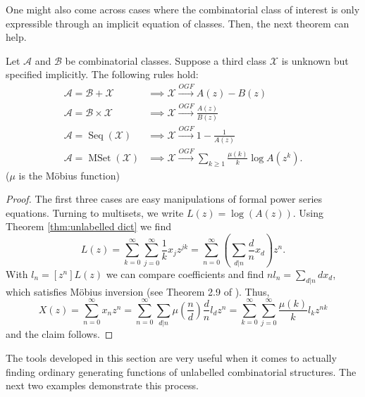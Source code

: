 One might also come across cases where the combinatorial class of interest is only expressible through an implicit equation of classes.
Then, the next theorem can help.

\begin{thm}
\label{thm:implogf}
Let $\mathcal{A}$ and $\mathcal{B}$ be combinatorial classes. Suppose a third class $\mathcal{X}$ is unknown but specified implicitly. The following rules hold:
\begin{align*}
    \mathcal{A} = \mathcal{B} + \mathcal{X} &\implies \mathcal{X} \xrightarrow{OGF} A(z) - B(z) \\
    \mathcal{A} = \mathcal{B} \times \mathcal{X} &\implies \mathcal{X} \xrightarrow{OGF} \frac{A(z)}{B(z)} \\
    \mathcal{A} = \operatorname{Seq}(\mathcal{X}) &\implies \mathcal{X} \xrightarrow{OGF} 1 - \frac{1}{A(z)} \\
    \mathcal{A} = \operatorname{MSet}(\mathcal{X}) &\implies \mathcal{X} \xrightarrow{OGF} \sum_{k \geq 1} \frac{\mu (k)}{k} \log A(z^k).
\end{align*}
($\mu$ is the Möbius function)
\end{thm}
\begin{proof}
The first three cases are easy manipulations of formal power series equations. 
Turning to multisets, we write $L(z) = \log(A(z))$.
Using Theorem \ref{thm:unlabelled dict} we find
\[
    L(z) = \sum_{k=0}^\infty \sum_{j=0}^\infty \frac{1}{k} x_j z^{jk} = \sum_{n=0}^\infty \left( \sum_{d|n} \frac{d}{n} x_d \right) z^n.
\]
With $l_n = [z^n] L(z)$ we can compare coefficients and find $n l_n = \sum_{d|n} d x_d$, which satisfies Möbius inversion (see Theorem 2.9 of \cite{numbertheory1}).
Thus, 
\[
    X(z) = \sum_{n=0}^\infty x_n z^n 
    = \sum_{n=0}^\infty \sum_{d|n} \mu\left(\frac{n}{d}\right) \frac{d}{n} l_d z^n 
    = \sum_{k=0}^\infty \sum_{j=0}^\infty \frac{\mu(k)}{k} l_k z^{n k}
\]
and the claim follows.
\end{proof}



The tools developed in this section are very useful when it comes to actually finding ordinary generating functions of unlabelled combinatorial structures. 
The next two examples demonstrate this process.


